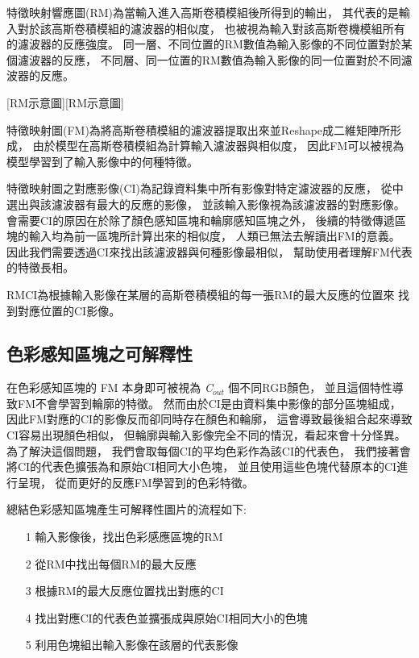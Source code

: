 \documentclass[class=NCU_thesis, crop=false]{standalone}
\begin{document}
	特徵映射響應圖(RM)為當輸入進入高斯卷積模組後所得到的輸出，
	其代表的是輸入對於該高斯卷積模組的濾波器的相似度，
	也被視為輸入對該高斯卷機模組所有的濾波器的反應強度。
	同一層、不同位置的RM數值為輸入影像的不同位置對於某個濾波器的反應，
	不同層、同一位置的RM數值為輸入影像的同一位置對於不同濾波器的反應。

	[RM示意圖\cite{YangCNNInterpretable}][RM示意圖]

	特徵映射圖(FM)為將高斯卷積模組的濾波器提取出來並Reshape成二維矩陣所形成，
	由於模型在高斯卷積模組為計算輸入濾波器與相似度，
	因此FM可以被視為模型學習到了輸入影像中的何種特徵。

	特徵映射圖之對應影像(CI)為記錄資料集中所有影像對特定濾波器的反應，
	從中選出與該濾波器有最大的反應的影像，
	並該輸入影像視為該濾波器的對應影像。
	會需要CI的原因在於除了顏色感知區塊和輪廓感知區塊之外，
	後續的特徵傳遞區塊的輸入均為前一區塊所計算出來的相似度，
	人類已無法去解讀出FM的意義。
	因此我們需要透過CI來找出該濾波器與何種影像最相似，
	幫助使用者理解FM代表的特徵長相。

	RM\-CI為根據輸入影像在某層的高斯卷積模組的每一張RM的最大反應的位置來
	找到對應位置的CI影像。

	\subsection{色彩感知區塊之可解釋性}
	在色彩感知區塊的 FM 本身即可被視為 \textit{C}$_{out}$ 個不同RGB顏色，
	並且這個特性導致FM不會學習到輪廓的特徵。
	然而由於CI是由資料集中影像的部分區塊組成，
	因此FM對應的CI的影像反而卻同時存在顏色和輪廓，
	這會導致最後組合起來導致CI容易出現顏色相似，
	但輪廓與輸入影像完全不同的情況，看起來會十分怪異。
	為了解決這個問題，
	我們會取每個CI的平均色彩作為該CI的代表色，
	我們接著會將CI的代表色擴張為和原始CI相同大小色塊，
	並且使用這些色塊代替原本的CI進行呈現，
	從而更好的反應FM學習到的色彩特徵。

	總結色彩感知區塊產生可解釋性圖片的流程如下:
	\begin{itemize}
		\item [1]
		輸入影像後，找出色彩感應區塊的RM
		\item [2]
		從RM中找出每個RM的最大反應
		\item [3]
		根據RM的最大反應位置找出對應的CI
		\item [4]
		找出對應CI的代表色並擴張成與原始CI相同大小的色塊
		\item [5]
		利用色塊組出輸入影像在該層的代表影像
	\end{itemize}
\end{document}
